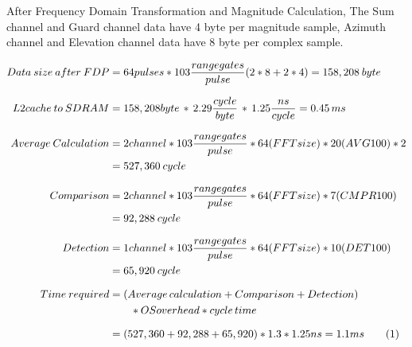 After Frequency Domain Transformation and Magnitude Calculation, The Sum channel and Guard channel data have 4 byte per magnitude sample, Azimuth channel and Elevation channel data have 8 byte per complex sample.

\begin{align*}
	\label{aa:scheme1:core4:equ2}
		Data \: size \: after \: FDP &=  64pulses * 103 \frac{range gates}{pulse} ( 2 * 8 + 2 * 4) = 158,208 \: byte\\[0.25cm] 
		L2cache \: to \: SDRAM &= 158,208 byte \, * \, 2.29\frac{cycle}{byte} \, * \, 1.25\frac{ns}{cycle} = 0.45 \, ms \\[0.25cm]
		Average \: Calculation &= 2channel * 103 \frac{range gates}{pulse} * 64(FFTsize) * 20(AVG100) * 2 \\
		&=  527,360 \: cycle \\[0.25cm]
		Comparison &= 2channel * 103 \frac{range gates}{pulse} * 64(FFTsize) * 7(CMPR100) \\
		&= 92,288 \: cycle \\[0.25cm]
		Detection &= 1channel * 103 \frac{range gates}{pulse} * 64(FFTsize) * 10(DET100) \\
		&= 65,920 \: cycle \\[0.25cm]
		Time \: required &= (Average \, calculation + Comparison + Detection) \\
		& \qquad * OSoverhead * cycle \, time \\[0.25cm]
		&= (527,360 + 92,288 + 65,920) * 1.3 * 1.25ns = 1.1ms \stepcounter{equation}\tag{\theequation} 
\end{align*}

